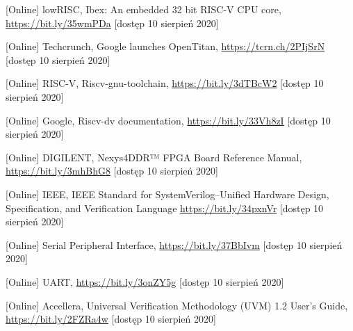 \documentclass[11pt,a4paper]{article}
\begin{document}
\begin{thebibliography}{10}
	[Online] lowRISC, Ibex: An embedded 32 bit RISC-V CPU core, \url{https://bit.ly/35wmPDa} [dostęp 10 sierpień 2020]
	
	[Online] Techcrunch, Google launches OpenTitan, \url{https://tcrn.ch/2PIjSrN} [dostęp 10 sierpień 2020]

	[Online] RISC-V, Riscv-gnu-toolchain, \url{https://bit.ly/3dTBcW2} [dostęp 10 sierpień 2020]
	
	[Online] Google, Riscv-dv documentation, \url{https://bit.ly/33Vh8zI} [dostęp 10 sierpień 2020]
	
	[Online] DIGILENT, Nexys4DDR™ FPGA Board Reference Manual, \url{https://bit.ly/3mhBhG8} [dostęp 10 sierpień 2020]
	
	[Online] IEEE, IEEE Standard for SystemVerilog--Unified Hardware Design, Specification, and Verification Language  \url{https://bit.ly/34pxnVr} [dostęp 10 sierpień 2020]
	
	[Online] Serial Peripheral Interface, \url{https://bit.ly/37BbIvm} [dostęp 10 sierpień 2020]

	[Online] UART, \url{https://bit.ly/3onZY5g} [dostęp 10 sierpień 2020]
	
	[Online] Accellera, Universal Verification Methodology (UVM) 1.2 User’s Guide, \url{https://bit.ly/2FZRa4w} [dostęp 10 sierpień 2020]
\end{thebibliography}
\end{document}
